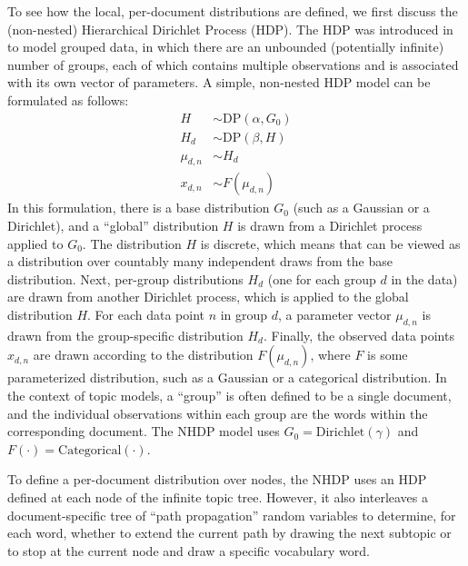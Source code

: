 \documentclass{article}
\begin{document}
To see how the local, per-document distributions are defined, we first discuss the (non-nested) Hierarchical Dirichlet Process (HDP).
The HDP was introduced in \cite{teh2005hdp} to model grouped data, in which there are an unbounded (potentially infinite) number of groups, each of which contains multiple observations and is associated with its own vector of parameters.
A simple, non-nested HDP model can be formulated as follows:
\begin{align*}
H &\sim \text{DP}(\alpha, G_0) \\
H_d &\sim \text{DP}(\beta, H) \\
\mu_{d,n} &\sim H_d \\
x_{d,n} &\sim F(\mu_{d,n})
\end{align*}
In this formulation, there is a base distribution $G_0$ (such as a Gaussian or a Dirichlet), and a ``global'' distribution $H$ is drawn from a Dirichlet process applied to $G_0$.
The distribution $H$ is discrete, which means that can be viewed as a distribution over countably many independent draws from the base distribution.
Next, per-group distributions $H_d$ (one for each group $d$ in the data) are drawn from another Dirichlet process, which is applied to the global distribution $H$.
For each data point $n$ in group $d$, a parameter vector $\mu_{d,n}$ is drawn from the group-specific distribution $H_d$.
Finally, the observed data points $x_{d,n}$ are drawn according to the distribution $F(\mu_{d,n})$, where $F$ is some parameterized distribution, such as a Gaussian or a categorical distribution.
In the context of topic models, a ``group'' is often defined to be a single document, and the individual observations within each group are the words within the corresponding document.
The NHDP model uses $G_0 = \text{Dirichlet}(\gamma)$ and $F(\cdot) = \text{Categorical}(\cdot)$.

To define a per-document distribution over nodes, the NHDP uses an HDP defined at each node of the infinite topic tree.
However, it also interleaves a document-specific tree of ``path propagation'' random variables to determine, for each word, whether to extend the current path by drawing the next subtopic or to stop at the current node and draw a specific vocabulary word.
\end{document}
